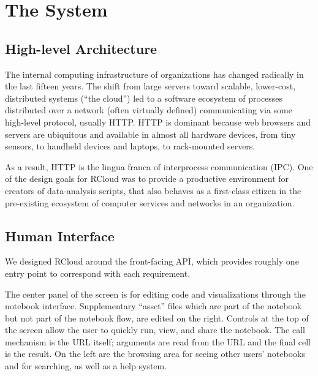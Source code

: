 \section{The System\label{sec:system}}

\subsection{High-level Architecture\label{sec:highlevelarchitecture}}

The internal computing infrastructure of organizations has changed
radically in the last fifteen years. The shift from large
servers toward scalable, lower-cost, distributed systems (``the cloud'')
led to a software ecosystem of processes distributed over a
network (often virtually defined) communicating via some
high-level protocol, usually HTTP. HTTP is dominant because web
browsers and servers are ubiquitous and available in almost
all hardware devices, from tiny sensors, to handheld devices and
laptops, to rack-mounted servers.

As a result, HTTP is the lingua franca of interprocess communication
(IPC). One of the design goals for RCloud was to provide a productive
environment for creators of data-analysis scripts, that also behaves
as a first-class citizen in the pre-existing ecosystem of computer
services and networks in an organization.


\subsection{Human Interface\label{sec:humaninterface}}

We designed RCloud around the front-facing API, which provides roughly
one entry point to correspond with each requirement.

The center panel of the screen is for editing code and visualizations through
the notebook interface. Supplementary ``asset'' files which are part of the
notebook but not part of the notebook flow, are edited on the right.
Controls at the top of the screen allow the user to quickly run, view, 
and share the notebook. The call mechanism is the URL itself; arguments are
read from the URL and the final cell is the result. On the left are the 
browsing area for seeing other users' notebooks and for searching, as well
as a help system.

